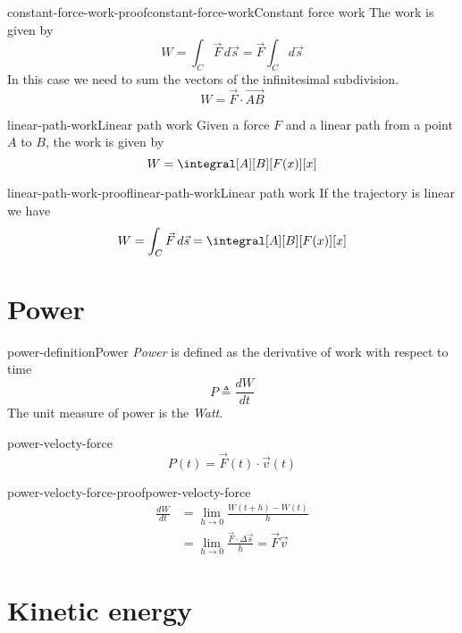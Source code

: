 \documentclass[preview]{standalone}
\begin{document}
\begin{snippetproof}{constant-force-work-proof}{constant-force-work}{Constant force work}
    The work is given by
    \[
        W = \int_C \vec{F}\,d\vec{s} = \vec{F} \int_C d\vec{s}
    \]
    In this case we need to sum the vectors of the infinitesimal subdivision.
    \[
        W = \vec{F} \cdot \vec{AB}
    \]
\end{snippetproof}

\begin{snippetproposition}{linear-path-work}{Linear path work}
    Given a force \(F\) and a linear path from a point \(A\) to \(B\), the work is given by
    \[
        W = \integral[A][B][F(x)][x]
    \]
\end{snippetproposition}

\begin{snippetproof}{linear-path-work-proof}{linear-path-work}{Linear path work}
    If the trajectory is linear we have
    \[
        W = \int_C \vec{F}\,d\vec{s} = \integral[A][B][F(x)][x]
    \]
\end{snippetproof}

\section{Power}

\begin{snippetdefinition}{power-definition}{Power}
    \emph{Power} is defined as the derivative of work with respect to time
    \[
        P \triangleq \frac{dW}{dt}
    \]
    The unit measure of power is the \emph{Watt}.
\end{snippetdefinition}

\begin{snippetproposition}{power-velocty-force}{}
    \[
        P(t) = \vec{F}(t) \cdot \vec{v}(t)
    \]
\end{snippetproposition}

\begin{snippetproof}{power-velocty-force-proof}{power-velocty-force}{}
    \begin{align*}
        \frac{dW}{dt} &= \lim_{h\to 0} \frac{W(t + h) - W(t)}{h} \\
        &= \lim_{h\to 0} \frac{\vec{F} \cdot \Delta \vec{s}}{h} = \vec{F} \vec{v}
    \end{align*}
\end{snippetproof}

\section{Kinetic energy}
\end{document}
